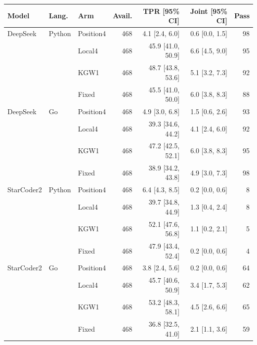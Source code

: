 \begin{tabular}{lllrrrr}
\toprule
Model & Lang. & Arm & Avail. & TPR [95\% CI] & Joint [95\% CI] & Pass \\
\midrule
DeepSeek & Python & Position4 & 468 & 4.1 [2.4, 6.0] & 0.6 [0.0, 1.5] & 98 \\
 &  & Local4 & 468 & 45.9 [41.0, 50.9] & 6.6 [4.5, 9.0] & 95 \\
 &  & KGW1 & 468 & 48.7 [43.8, 53.6] & 5.1 [3.2, 7.3] & 92 \\
 &  & Fixed & 468 & 45.5 [41.0, 50.0] & 6.0 [3.8, 8.3] & 88 \\
DeepSeek & Go & Position4 & 468 & 4.9 [3.0, 6.8] & 1.5 [0.6, 2.6] & 93 \\
 &  & Local4 & 468 & 39.3 [34.6, 44.2] & 4.1 [2.4, 6.0] & 92 \\
 &  & KGW1 & 468 & 47.2 [42.5, 52.1] & 6.0 [3.8, 8.3] & 95 \\
 &  & Fixed & 468 & 38.9 [34.2, 43.8] & 4.9 [3.0, 7.3] & 98 \\
StarCoder2 & Python & Position4 & 468 & 6.4 [4.3, 8.5] & 0.2 [0.0, 0.6] & 8 \\
 &  & Local4 & 468 & 39.7 [34.8, 44.9] & 1.3 [0.4, 2.4] & 8 \\
 &  & KGW1 & 468 & 52.1 [47.6, 56.8] & 1.1 [0.2, 2.1] & 5 \\
 &  & Fixed & 468 & 47.9 [43.4, 52.4] & 0.2 [0.0, 0.6] & 4 \\
StarCoder2 & Go & Position4 & 468 & 3.8 [2.4, 5.6] & 0.2 [0.0, 0.6] & 64 \\
 &  & Local4 & 468 & 45.7 [40.6, 50.9] & 3.4 [1.7, 5.3] & 62 \\
 &  & KGW1 & 468 & 53.2 [48.3, 58.1] & 4.5 [2.6, 6.6] & 65 \\
 &  & Fixed & 468 & 36.8 [32.5, 41.0] & 2.1 [1.1, 3.6] & 59 \\
\bottomrule
\end{tabular}
